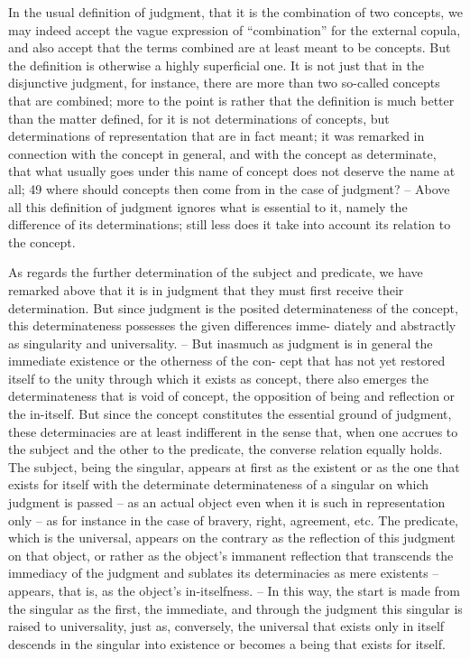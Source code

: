 In the usual definition of judgment, that it is the combination of two
concepts, we may indeed accept the vague expression of “combination” for
the external copula, and also accept that the terms combined are at least
meant to be concepts. But the definition is otherwise a highly superficial
one. It is not just that in the disjunctive judgment, for instance, there are
more than two so-called concepts that are combined; more to the point is
rather that the definition is much better than the matter defined, for it is not
determinations of concepts, but determinations of representation that are in
fact meant; it was remarked in connection with the concept in general, and
with the concept as determinate, that what usually goes under this name
of concept does not deserve the name at all; 49 where should concepts then
come from in the case of judgment? – Above all this definition of judgment
ignores what is essential to it, namely the difference of its determinations;
still less does it take into account its relation to the concept.

As regards the further determination of the subject and predicate, we
have remarked above that it is in judgment that they must first receive
their determination. But since judgment is the posited determinateness
of the concept, this determinateness possesses the given differences imme-
diately and abstractly as singularity and universality. – But inasmuch as
judgment is in general the immediate existence or the otherness of the con-
cept that has not yet restored itself to the unity through which it exists as
concept, there also emerges the determinateness that is void of concept,
the opposition of being and reflection or the in-itself. But since the concept
constitutes the essential ground of judgment, these determinacies are at least
indifferent in the sense that, when one accrues to the subject and the other
to the predicate, the converse relation equally holds. The subject, being
the singular, appears at first as the existent or as the one that exists for itself
with the determinate determinateness of a singular on which judgment is
passed – as an actual object even when it is such in representation only –
as for instance in the case of bravery, right, agreement, etc. The predicate,
which is the universal, appears on the contrary as the reflection of this
judgment on that object, or rather as the object’s immanent reflection that
transcends the immediacy of the judgment and sublates its determinacies
as mere existents – appears, that is, as the object’s in-itselfness. – In this way,
the start is made from the singular as the first, the immediate, and through
the judgment this singular is raised to universality, just as, conversely, the
universal that exists only in itself descends in the singular into existence or
becomes a being that exists for itself.


